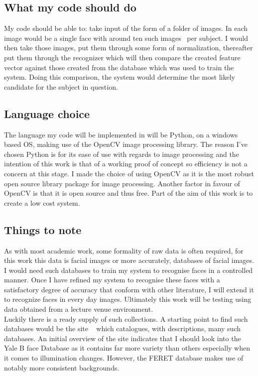 	\subsection{What my code should do} 
		My code should be able to: take input of the form of a folder of images.  In each image would be a single face 
		with around ten such images~\cite{OpenCVTut} per subject.  I would then take those images, put them through some form of 
		normalization, thereafter put them through the recognizer which will then compare the created feature vector 
		against those created from the database which was used to train the system.  Doing this comparison, the system 
		would determine the most likely candidate for the subject in question.  

	\subsection{Language choice}
		The language my code will be implemented in will be Python, on a windows based OS, making use of the OpenCV image 
		processing library.  The reason I've chosen Python is for its ease of use with regards to image processing and 
		the intention of this work is that of a working proof of concept so efficiency is not a concern at this stage.  
		I made the choice of using OpenCV as it is the most robust open source library package for image processing.  
		Another factor in favour of OpenCV is that it is open source and thus free.  Part of the aim of this work is to 
		create a low cost system. 
		
	\subsection{Things to note}
		As with most academic work, some formality of raw data is often required, for this work this data is facial images or more 
		accurately, databases of facial images.  I would need such databases to train my system to recognise faces in a 
		controlled manner.  Once I have refined my system to recognise these faces with a satisfactory degree of accuracy 
		that conform with other literature, I will extend it to recognize faces in every day images.  Ultimately this work will be testing using 
		data obtained from a lecture venue environment. \\

		Luckily there is a ready supply of such collections.  A starting point to find such databases would be the site
		~\cite{urldatabases} which catalogues, with descriptions, many such databases.  An initial overview of the site 
		indicates that I should look into the Yale B face Database as it contains far more variety than others especially 
		when it comes to illumination changes.  However, the FERET database makes use of notably more consistent backgrounds.  \\
		
